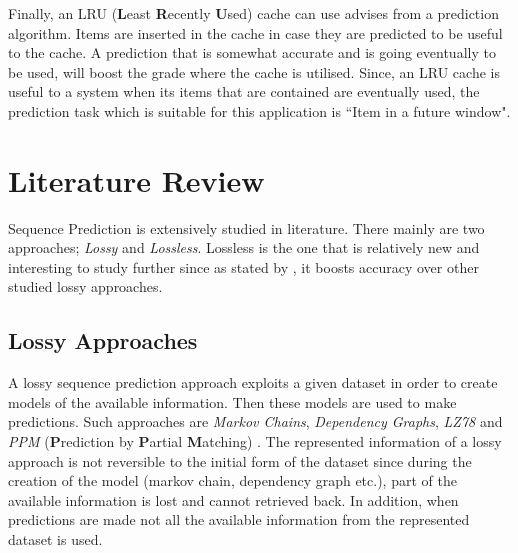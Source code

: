 \par Finally, an LRU (\textbf{L}east \textbf{R}ecently \textbf{U}sed) cache can use advises from a prediction algorithm. Items are inserted in the cache in case they are predicted to be useful to the cache. A prediction that is somewhat accurate and is going eventually to be used, will boost the grade where the cache is utilised. Since, an LRU cache is useful to a system when its items that are contained are eventually used, the prediction task which is suitable for this application is ``Item in a future window".
\section{Literature Review}{\label{lit_rev}}
Sequence Prediction is extensively studied in literature. There mainly are two approaches; \emph{Lossy} and \emph{Lossless}. Lossless is the one that is relatively new and interesting to study further since as stated by \citeauthor{gueniche_fournier-viger_tseng_2013}, it boosts accuracy over other studied lossy approaches.

\subsection{Lossy Approaches}
A lossy sequence prediction approach exploits a given dataset in order to create models of the available information. Then these models are used to make predictions. Such approaches are \emph{Markov Chains}, \emph{Dependency Graphs}, \emph{LZ78} and \emph{PPM} (\textbf{P}rediction by \textbf{P}artial \textbf{M}atching) \cite{cleary_witten_1984, Pitkow99mininglongest, Padmanabhan:1996:UPP:235160.235164, Moghaddam_Kabir}. The represented information of a lossy approach is not reversible to the initial form of the dataset since during the creation of the model (markov chain, dependency graph etc.), part of the available information is lost and cannot retrieved back. In addition, when predictions are made not all the available information from the represented dataset is used.
